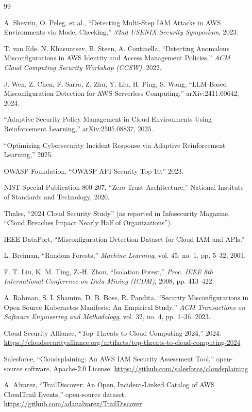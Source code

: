 \documentclass[11pt,a4paper]{article}
\begin{document}
\begin{thebibliography}{99}

 A. Shevrin, O. Peleg, et al., ``Detecting Multi-Step IAM Attacks in AWS Environments via Model Checking,'' \emph{32nd USENIX Security Symposium}, 2023.

 T. van Ede, N. Khasuntsev, B. Steen, A. Continella, ``Detecting Anomalous Misconfigurations in AWS Identity and Access Management Policies,'' \emph{ACM Cloud Computing Security Workshop (CCSW)}, 2022.

 J. Wen, Z. Chen, F. Sarro, Z. Zhu, Y. Liu, H. Ping, S. Wang, ``LLM-Based Misconfiguration Detection for AWS Serverless Computing,'' arXiv:2411.00642, 2024.

 ``Adaptive Security Policy Management in Cloud Environments Using Reinforcement Learning,'' arXiv:2505.08837, 2025.

 ``Optimizing Cybersecurity Incident Response via Adaptive Reinforcement Learning,'' 2025.

 OWASP Foundation, ``OWASP API Security Top 10,'' 2023.

 NIST Special Publication 800-207, ``Zero Trust Architecture,'' National Institute of Standards and Technology, 2020.

 Thales, ``2024 Cloud Security Study'' (as reported in Infosecurity Magazine, ``Cloud Breaches Impact Nearly Half of Organizations'').

 IEEE DataPort, ``Misconfiguration Detection Dataset for Cloud IAM and APIs.''

 L. Breiman, ``Random Forests,'' \emph{Machine Learning}, vol. 45, no. 1, pp. 5--32, 2001.

 F. T. Liu, K. M. Ting, Z.-H. Zhou, ``Isolation Forest,'' \emph{Proc. IEEE 8th International Conference on Data Mining (ICDM)}, 2008, pp. 413--422.

 A. Rahman, S. I. Shamim, D. B. Bose, R. Pandita, ``Security Misconfigurations in Open Source Kubernetes Manifests: An Empirical Study,'' \emph{ACM Transactions on Software Engineering and Methodology}, vol. 32, no. 4, pp. 1--36, 2023.

 Cloud Security Alliance, ``Top Threats to Cloud Computing 2024,'' 2024. \url{https://cloudsecurityalliance.org/artifacts/top-threats-to-cloud-computing-2024}

 Salesforce, ``Cloudsplaining: An AWS IAM Security Assessment Tool,'' open-source software, Apache-2.0 License. \url{https://github.com/salesforce/cloudsplaining}

 A. Alvarez, ``TrailDiscover: An Open, Incident-Linked Catalog of AWS CloudTrail Events,'' open-source dataset. \url{https://github.com/adanalvarez/TrailDiscover}

\end{thebibliography}
\end{document}
